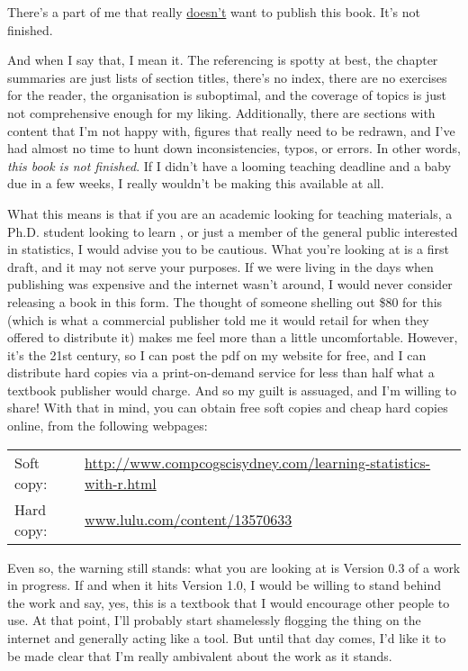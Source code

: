 \noindent
There's a part of me that really \underline{doesn't} want to publish this book. It's not finished. \vsp

And when I say that, I mean it. The referencing is spotty at best, the chapter summaries are just lists of section titles, there's no index, there are no exercises for the reader, the organisation is suboptimal, and the coverage of topics is just not comprehensive enough for my liking. Additionally, there are sections with content that I'm not happy with, figures that really need to be redrawn, and I've had almost no time to hunt down inconsistencies, typos, or errors. In other words, {\it this book is not finished}. If I didn't have a looming teaching deadline and a baby due in a few weeks, I really wouldn't be making this available at all. \vsp

What this means is that if you are an academic looking for teaching materials, a Ph.D. student looking to learn \R, or just a member of the general public interested in statistics, I would advise you to be cautious. What you're looking at is a first draft, and it may not serve your purposes. If we were living in the days when publishing was expensive and the internet wasn't around, I would never consider releasing a book in this form. The thought of someone shelling out \$80 for this (which is what a commercial publisher told me it would retail for when they offered to distribute it) makes me feel more than a little uncomfortable. However, it's the 21st century, so I can post the pdf on my website for free, and I can distribute hard copies via a print-on-demand service for less than half what a textbook publisher would charge. And so my guilt is assuaged, and I'm willing to share! With that in mind, you can obtain free soft copies and cheap hard copies online, from the following webpages:\vsp

\noindent
\begin{tabular}{ll}
Soft copy: &\url{http://www.compcogscisydney.com/learning-statistics-with-r.html}\\
Hard copy: & \url{www.lulu.com/content/13570633} 
\end{tabular}
\vsp

Even so, the warning still stands: what you are looking at is Version 0.3 of a work in progress. If and when it hits Version 1.0, I would be willing to stand behind the work and say, yes, this is a textbook that I would encourage other people to use. At that point, I'll probably start shamelessly flogging the thing on the internet and generally acting like a tool. But until that day comes, I'd like it to be made clear that I'm really ambivalent about the work as it stands. \vsp

